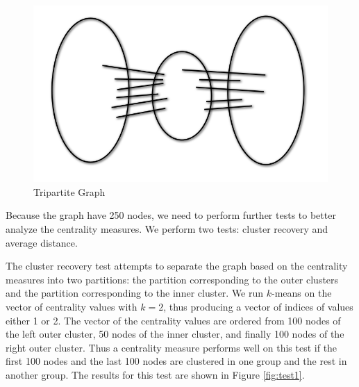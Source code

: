 \documentclass[10pt]{siamltex}
\begin{document}
\begin{pagewiselinenumbers}
\begin{figure}[h!]
\begin{center}
\includegraphics[width=0.56\columnwidth]{tripartite}
\end{center}
\caption{Tripartite Graph}
\label{fig:Tripartite Graph}
\end{figure}

Because the graph have 250 nodes, we need to perform further tests to better analyze the centrality measures. We perform two tests: cluster recovery and average distance. 

The cluster recovery test attempts to separate the graph based on the centrality measures into two partitions: the partition corresponding to the outer clusters and the partition corresponding to the inner cluster. We run $k$-means on the vector of centrality values with $k=2$, thus producing a vector of indices of values either 1 or 2. The vector of the centrality values are ordered from 100 nodes of the left outer cluster, 50 nodes of the inner cluster, and finally 100 nodes of the right outer cluster. Thus a centrality measure performs well on this test if the first 100 nodes and the last 100 nodes are clustered in one group and the rest in another group. The results for this test are shown in Figure \ref{fig:test1}.


\end{pagewiselinenumbers}
\end{document}
